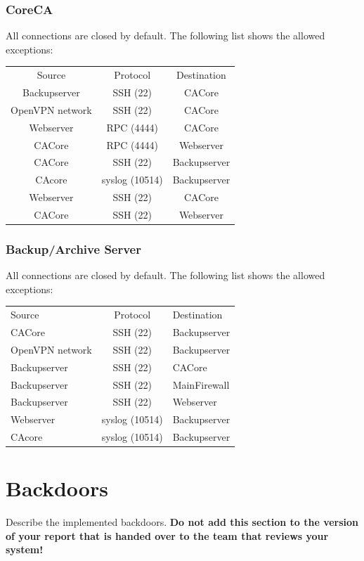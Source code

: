 \documentclass[a4paper, toc=index, 12pt, DIV14, twoside, BCOR2cm, headsepline, numbers=noenddot, bibliography=totoc]{scrbook}
\begin{document}
\subsubsection{CoreCA}
All connections are closed by default. The following list shows the allowed exceptions:\newline


\begin{tabular}{c c c}
Source & Protocol & Destination \\
\cline{1-3}
Backupserver & SSH (22) & CACore \\
\cline{1-3}
OpenVPN network & SSH (22) & CACore \\
\cline{1-3}
Webserver & RPC (4444) & CACore \\
\cline{1-3}
CACore & RPC (4444) & Webserver \\
\cline{1-3}
CACore & SSH (22) & Backupserver \\
\cline{1-3}
CAcore & syslog (10514) & Backupserver \\
\cline{1-3}
Webserver & SSH (22) & CACore \\
\cline{1-3}
CACore & SSH (22) & Webserver \\
\end{tabular}

\subsubsection{Backup/Archive Server}
All connections are closed by default. The following list shows the allowed exceptions:\newline


\begin{tabular}{l c l}
Source & Protocol & Destination \\
\cline{1-3}
CACore & SSH (22) & Backupserver \\
\cline{1-3}
OpenVPN network & SSH (22) &  Backupserver\\
\cline{1-3}
Backupserver & SSH (22) & CACore \\
\cline{1-3}
Backupserver & SSH (22) & MainFirewall \\
\cline{1-3}
Backupserver & SSH (22) & Webserver \\
\cline{1-3}
Webserver & syslog (10514) & Backupserver \\
\cline{1-3}
CAcore & syslog (10514) & Backupserver \\
\end{tabular}

\section{Backdoors}
Describe the implemented backdoors. {\bfseries Do not add
    this section to the version of your report that is handed over to
    the team that reviews your system!}
\end{document}
